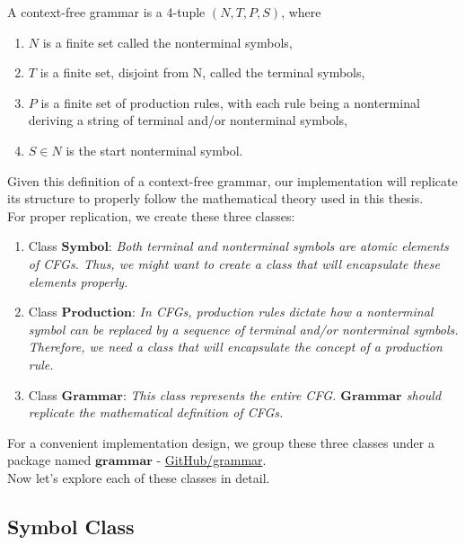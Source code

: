 \begin{definition}[1.0]
    A context-free grammar is a 4-tuple \((N, T, P, S)\), where
    \begin{enumerate}
        \item \(N\) is a finite set called the nonterminal symbols,
        \item \(T\) is a finite set, disjoint from N, called the terminal symbols,
        \item \(P\) is a finite set of production rules, with each rule being a nonterminal deriving a string of terminal and/or nonterminal symbols,
        \item \(S \in N\) is the start nonterminal symbol.
    \end{enumerate}
\end{definition}
\setlength{\parindent}{0pt}

Given this definition of a context-free grammar, our implementation will replicate its structure to properly follow the mathematical theory used in this thesis.\\

For proper replication, we create these three classes:
\begin{enumerate}
    \item Class \(\boldsymbol{Symbol}\): \textit{Both terminal and nonterminal symbols are atomic elements of CFGs. Thus, we might want to create a class that will encapsulate these elements properly.}
    \item Class \(\boldsymbol{Production}\): \textit{In CFGs, production rules dictate how a nonterminal symbol can be replaced by a sequence of terminal and/or nonterminal symbols. Therefore, we need a class that will encapsulate the concept of a production rule.}
    \item Class \(\boldsymbol{Grammar}\): \textit{This class represents the entire CFG. \(\boldsymbol{Grammar}\) should replicate the mathematical definition of CFGs.}
\end{enumerate}

For a convenient implementation design, we group these three classes under a package named \(\boldsymbol{grammar}\) - \href{https://github.com/fyfsb/dcfg/tree/main/src/main/java/grammar}{GitHub/grammar}.\\

Now let’s explore each of these classes in detail.

\subsection{Symbol Class}

